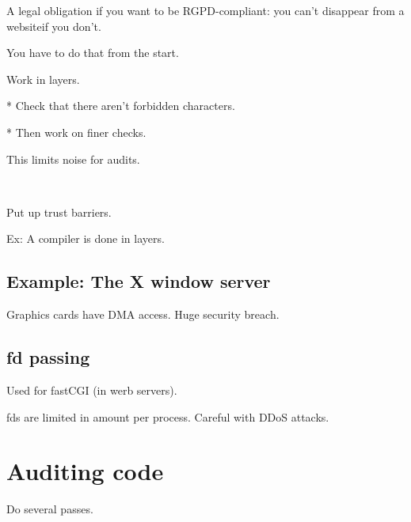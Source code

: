 \documentclass[a4paper,11pt]{article}
\begin{document}
A legal obligation if you want to be RGPD-compliant: you can't disappear from a
websiteif you don't.

You have to do that from the start.

Work in layers.

* Check that there aren't forbidden characters.

* Then work on finer checks.

This limits noise for audits.

\

Put up trust barriers.

Ex: A compiler is done in layers.

\subsection{Example: The X window server}

Graphics cards have DMA access. Huge security breach.

\subsection{fd passing}

Used for fastCGI (in werb servers).

fds are limited in amount per process. Careful with DDoS attacks.

\section{Auditing code}

Do several passes.
\end{document}
